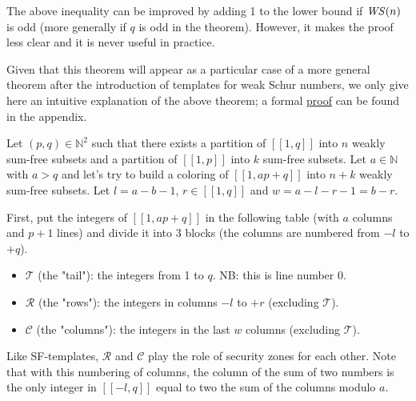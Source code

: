 \begin{remark}
The above inequality can be improved by adding 1 to the lower bound if \(\mathit{WS} (n)\) is odd (more generally if \(q\) is
odd in the theorem). However, it makes the proof less clear and it is never useful in practice.
\end{remark}

Given that this theorem will appear as a particular case of a more general theorem after the introduction of
templates for weak Schur numbers, we only give here an intuitive explanation of the above theorem; a formal
\hyperref[proof_theorem]{proof} can be found in the appendix.

Let \((p, q) \in \mathbb{N}^2\) such that there exists a partition of \([\![1,q]\!]\) into \(n\) weakly sum-free
subsets and a partition of \([\![1,p]\!]\) into \(k\) sum-free subsets. Let \(a \in \mathbb{N}\) with \(a > q\)
and let's try to build a coloring of \([\![1, ap + q]\!]\) into \(n + k\) weakly sum-free subsets. Let
\(l = a - b - 1\), \(r \in [\![1,q]\!]\) and \(w = a - l - r - 1 = b - r\).

First, put the integers of \([\![1, ap + q]\!]\) in the following table (with \(a\) columns and \(p + 1\) lines) 
and divide it into 3 blocks (the columns are numbered from \(-l\) to \(+q\)).

\begin{itemize}
	\item \(\mathcal{T}\) (the "tail"): the integers from 1 to \(q\). NB: this is line number 0.
	\item \(\mathcal{R}\) (the "rows"): the integers in columns \(-l\) to \(+r\) (excluding  \(\mathcal{T}\)).
	\item \(\mathcal{C}\) (the "columns"): the integers in the last \(w\) columns (excluding  \(\mathcal{T}\)).
\end{itemize}

Like SF-templates, \(\mathcal{R}\) and \(\mathcal{C}\) play the role of security zones for each other. Note that with
this numbering of columns, the column of the sum of two numbers is the only integer in \([\![-l,q]\!]\) equal to two the
sum of the columns modulo \(a\).

\renewcommand{\arraystretch}{1.7}

